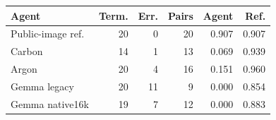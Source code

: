 \begin{tabular}{@{}lrrrrr@{}}
\toprule
Agent & Term. & Err. & Pairs & Agent & Ref. \\
\midrule
Public-image ref. & 20 & 0 & 20 & 0.907 & 0.907 \\
Carbon & 14 & 1 & 13 & 0.069 & 0.939 \\
Argon & 20 & 4 & 16 & 0.151 & 0.960 \\
Gemma legacy & 20 & 11 & 9 & 0.000 & 0.854 \\
Gemma native16k & 19 & 7 & 12 & 0.000 & 0.883 \\
\bottomrule
\end{tabular}
